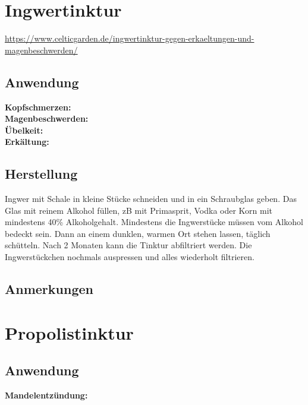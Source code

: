 \newpage


\section{Ingwertinktur}


\url{https://www.celticgarden.de/ingwertinktur-gegen-erkaeltungen-und-magenbeschwerden/}

   

\subsection{Anwendung}
\textbf{Kopfschmerzen:} \\ 

\textbf{Magenbeschwerden:} \\ 

\textbf{Übelkeit:} \\ 

\textbf{Erkältung:} \\ 


\subsection{Herstellung}

Ingwer mit Schale in kleine Stücke schneiden und in ein Schraubglas geben. Das Glas mit reinem Alkohol füllen, zB mit Primasprit, Vodka oder Korn mit mindestens 40\% Alkoholgehalt. Mindestens die Ingwerstücke müssen vom Alkohol bedeckt sein. Dann an einem dunklen, warmen Ort stehen lassen, täglich schütteln. Nach 2 Monaten kann die Tinktur abfiltriert werden. Die Ingwerstückchen nochmals auspressen und alles wiederholt filtrieren.

\subsection{Anmerkungen}


\newpage


\section{Propolistinktur}


  

\subsection{Anwendung}
\textbf{Mandelentzündung:} \\

